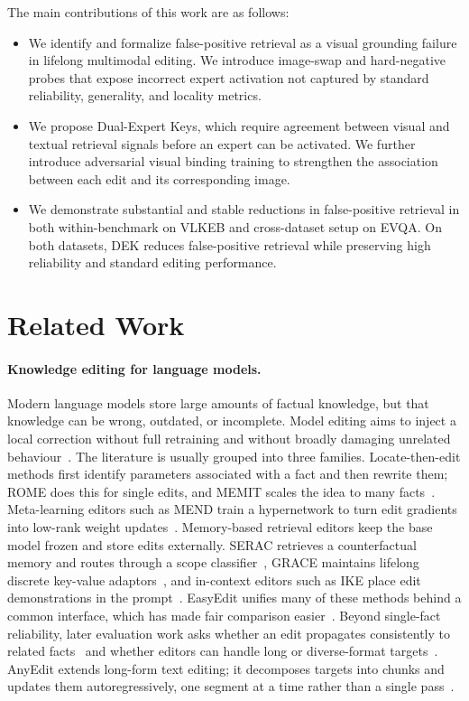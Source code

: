 \documentclass[letterpaper]{article} %
\begin{document}
The main contributions of this work are as follows:
\begin{itemize}
    \item We identify and formalize false-positive retrieval as a visual grounding failure in lifelong multimodal editing. We introduce image-swap and hard-negative probes that expose incorrect expert activation not captured by standard reliability, generality, and locality metrics.
    
    \item We propose Dual-Expert Keys, which require agreement between visual and textual retrieval signals before an expert can be activated. We further introduce adversarial visual binding training to strengthen the association between each edit and its corresponding image.
    
    \item We demonstrate substantial and stable reductions in false-positive retrieval in both within-benchmark on VLKEB and cross-dataset setup on EVQA. On both datasets, DEK reduces false-positive retrieval while preserving high reliability and standard editing performance.
\end{itemize}

\section{Related Work}
\label{sec:related}

\paragraph{Knowledge editing for language models.}
Modern language models store large amounts of factual knowledge, but that knowledge can be wrong, outdated, or incomplete.
Model editing aims to inject a local correction without full retraining and without broadly damaging unrelated behaviour~\citep{decao2021knowledgeeditor,yao2023editing}.
The literature is usually grouped into three families.
Locate-then-edit methods first identify parameters associated with a fact and then rewrite them; ROME does this for single edits, and MEMIT scales the idea to many facts~\citep{meng2022rome,meng2023memit}.
Meta-learning editors such as MEND train a hypernetwork to turn edit gradients into low-rank weight updates~\citep{Mitchell2021FastME}.
Memory-based retrieval editors keep the base model frozen and store edits externally. SERAC retrieves a counterfactual memory and routes through a scope classifier~\citep{mitchell2022serac}, GRACE maintains lifelong discrete key-value adaptors~\citep{hartvigsen2023grace}, and in-context editors such as IKE place edit demonstrations in the prompt~\citep{zheng2023ike}.
EasyEdit unifies many of these methods behind a common interface, which has made fair comparison easier~\citep{wang2024easyedit}.
Beyond single-fact reliability, later evaluation work asks whether an edit propagates consistently to related facts~\citep{cohen2024evaluating} and whether editors can handle long or diverse-format targets~\citep{jiang2025anyedit}.
AnyEdit extends long-form text editing; it decomposes targets into chunks and updates them autoregressively, one segment at a time rather than a single pass~\citep{jiang2025anyedit}.
\end{document}
